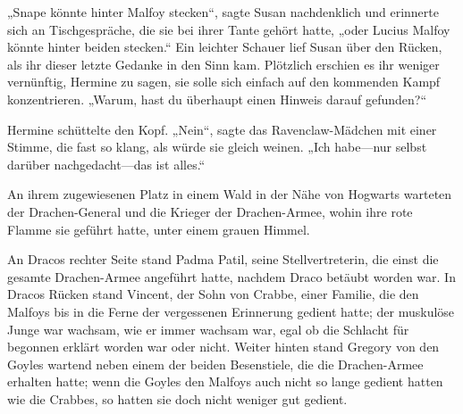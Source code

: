 „Snape könnte hinter Malfoy stecken“, sagte Susan nachdenklich und erinnerte sich an Tischgespräche, die sie bei ihrer Tante gehört hatte, „oder Lucius Malfoy könnte hinter beiden stecken.“ Ein leichter Schauer lief Susan über den Rücken, als ihr dieser letzte Gedanke in den Sinn kam. Plötzlich erschien es ihr weniger vernünftig, Hermine zu sagen, sie solle sich einfach auf den kommenden Kampf konzentrieren. „Warum, hast du überhaupt einen Hinweis darauf gefunden?“

Hermine schüttelte den Kopf. „Nein“, sagte das Ravenclaw-Mädchen mit einer Stimme, die fast so klang, als würde sie gleich weinen. „Ich habe—nur selbst darüber nachgedacht—das ist alles.“

\later

An ihrem zugewiesenen Platz in einem Wald in der Nähe von Hogwarts warteten der Drachen-General und die Krieger der Drachen-Armee, wohin ihre rote Flamme sie geführt hatte, unter einem grauen Himmel.

An Dracos rechter Seite stand Padma Patil, seine Stellvertreterin, die einst die gesamte Drachen-Armee angeführt hatte, nachdem Draco betäubt worden war. In Dracos Rücken stand Vincent, der Sohn von Crabbe, einer Familie, die den Malfoys bis in die Ferne der vergessenen Erinnerung gedient hatte; der muskulöse Junge war wachsam, wie er immer wachsam war, egal ob die Schlacht für begonnen erklärt worden war oder nicht. Weiter hinten stand Gregory von den Goyles wartend neben einem der beiden Besenstiele, die die Drachen-Armee erhalten hatte; wenn die Goyles den Malfoys auch nicht so lange gedient hatten wie die Crabbes, so hatten sie doch nicht weniger gut gedient.

